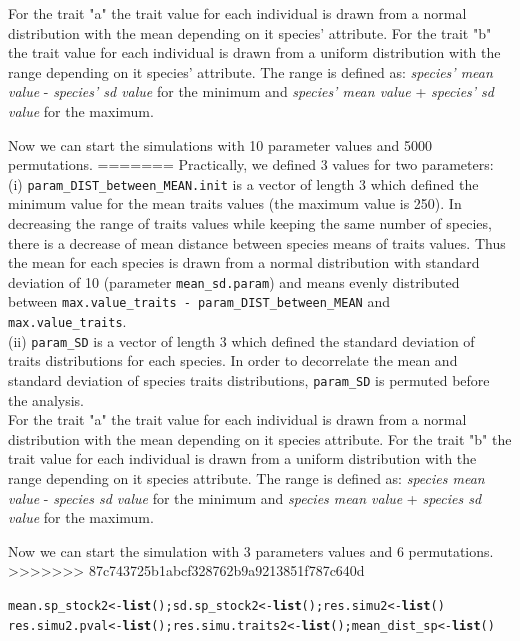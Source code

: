 \documentclass[12pt]{article}\usepackage[]{graphicx}\usepackage[]{color}
\makeatletter
\newcommand{\hlstd}[1]{\textcolor[rgb]{0.345,0.345,0.345}{#1}}%
\newcommand{\hlkwb}[1]{\textcolor[rgb]{0.69,0.353,0.396}{#1}}%
\newcommand{\hlkwd}[1]{\textcolor[rgb]{0.737,0.353,0.396}{\textbf{#1}}}%
\newenvironment{kframe}{%
 \def\at@end@of@kframe{}%
 \ifinner\ifhmode%
  \def\at@end@of@kframe{\end{minipage}}%
  \begin{minipage}{\columnwidth}%
 \fi\fi%
 \def\FrameCommand##1{\hskip\@totalleftmargin \hskip-\fboxsep
 \colorbox{shadecolor}{##1}\hskip-\fboxsep
     \hskip-\linewidth \hskip-\@totalleftmargin \hskip\columnwidth}%
 \MakeFramed {\advance\hsize-\width
   \@totalleftmargin\z@ \linewidth\hsize
   \@setminipage}}%
 {\par\unskip\endMakeFramed%
 \at@end@of@kframe}
\newenvironment{knitrout}{}{} %
\makeatother
\begin{document}
\begin{landscape}
For the trait "a" the trait value for each individual is drawn from a normal distribution with the mean depending on it species' attribute. For the trait "b" the trait value for each individual is drawn from a uniform distribution with the range depending on it species' attribute. The range is defined as: \textit{species' mean value} - \textit{species' sd value} for the minimum and \textit{species' mean value} + \textit{species' sd value} for the maximum.

Now we can start the simulations with 10 parameter values and 5000 permutations. 
=======
 Practically, we defined 3 values for two parameters:
\\

 (i) \texttt{param\_{}DIST\_{}between\_{}MEAN.init} is a vector of length 3 which defined the minimum value for the mean traits values (the maximum value is 250). In decreasing the range of traits values while keeping the same number of species, there is a decrease of mean distance between species means of traits values. Thus the mean for each species is drawn from a normal distribution with standard deviation of 10 (parameter \texttt{mean\_{}sd.param}) and means evenly distributed between \texttt{max.value\_{}traits - param\_{}DIST\_{}between\_{}MEAN} and \texttt{max.value\_{}traits}.
\\

(ii) \texttt{param\_{}SD} is a vector of length 3 which defined the standard deviation of traits distributions for each species. In order to decorrelate the mean and standard deviation of species traits distributions, \texttt{param\_{}SD} is permuted before the analysis. 
\\

For the trait "a" the trait value for each individual is drawn from a normal distribution with the mean depending on it species attribute. For the trait "b" the trait value for each individual is drawn from a uniform distribution with the range depending on it species attribute. The range is defined as: \textit{species mean value} - \textit{species sd value} for the minimum and \textit{species mean value} + \textit{species sd value} for the maximum.

Now we can start the simulation with 3 parameters values and 6 permutations. 
>>>>>>> 87c743725b1abcf328762b9a9213851f787c640d

\begin{knitrout}\small
{}\color{fgcolor}\begin{kframe}
\begin{alltt}
\hlstd{mean.sp_stock2} \hlkwb{<-} \hlkwd{list}\hlstd{() ; sd.sp_stock2} \hlkwb{<-} \hlkwd{list}\hlstd{() ; res.simu2} \hlkwb{<-} \hlkwd{list}\hlstd{()}
\hlstd{res.simu2.pval} \hlkwb{<-} \hlkwd{list}\hlstd{() ; res.simu.traits2} \hlkwb{<-} \hlkwd{list}\hlstd{() ;  mean_dist_sp} \hlkwb{<-} \hlkwd{list}\hlstd{()}


\end{alltt}
\end{kframe}
\end{knitrout}
\end{landscape}
\end{document}
